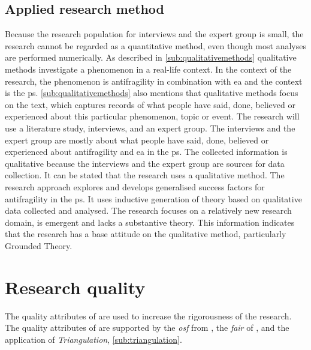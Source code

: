 \subsection{Applied research method}
\label{sub:usedmethod}
Because the research population for interviews and the expert group is small, the research cannot be regarded as a quantitative method, even though most analyses are performed numerically. As described in \cref{sub:qualitativemethods} qualitative methods investigate a phenomenon in a real-life context. In the context of the research, the phenomenon is \gls{antifragility} in combination with \acrlong{ea} and the context is the \gls{ps}. \cref{sub:qualitativemethods} also mentions that qualitative methods focus on the text, which captures records of what people have said, done, believed or experienced about this particular phenomenon, topic or event. The research will use a literature study, interviews, and an expert group. The interviews and the expert group are mostly about what people have said, done, believed or experienced about \gls{antifragility} and \acrlong{ea} in the \gls{ps}. The collected information is qualitative because the interviews and the expert group are sources for data collection. It can be stated that the research uses a qualitative method. The research approach explores and develops generalised success factors for \gls{antifragility} in the \gls{ps}. It uses inductive generation of theory based on qualitative data collected and analysed. The research focuses on a relatively new research domain, is emergent and lacks a substantive theory. This information indicates that the research has a base attitude on the qualitative method, particularly Grounded Theory.

\section{Research quality}
\label{sec:researchquality}
The quality attributes of \textcite[p.~15--17]{Recker2012} are used to increase the rigorousness of the research. The quality attributes of \textcite[p.~15--17]{Recker2012} are supported by the \textit{\acrfull{osf}} from \textcite{Foster2017}, the \textit{\gls{fair}} of \textcite[Box 2]{Wilkinson2016}, and the application of \textit{Triangulation}, \cref{sub:triangulation}.

